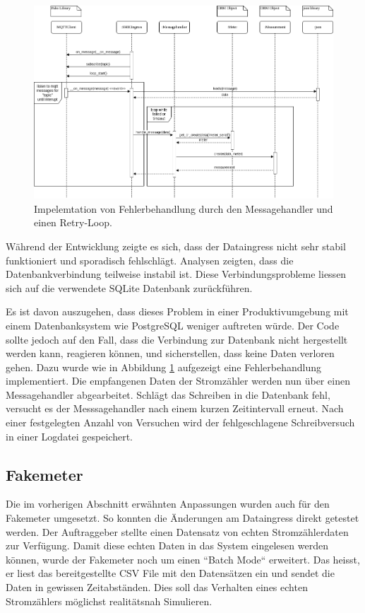 \begin{figure}[H]
    \centering
    \includegraphics[width=1.0\textwidth]{gfx/dataingress-sequence}
    \caption{
        Impelemtation von Fehlerbehandlung durch den Messagehandler und einen
        Retry-Loop.
    }
    \label{fig:dataingress-sequence}
\end{figure}

Während der Entwicklung zeigte es sich, dass der Dataingress nicht sehr stabil
funktioniert und sporadisch fehlschlägt. Analysen zeigten, dass
die Datenbankverbindung teilweise instabil ist.
Diese Verbindungsprobleme liessen sich auf die verwendete SQLite Datenbank zurückführen.

Es ist davon auszugehen, dass dieses Problem in einer Produktivumgebung mit einem Datenbanksystem wie PostgreSQL
weniger auftreten würde.
Der Code sollte jedoch auf den Fall, dass die Verbindung zur Datenbank nicht hergestellt werden kann, reagieren können,
und sicherstellen, dass keine Daten verloren gehen.
Dazu wurde wie in Abbildung \ref{fig:dataingress-sequence} aufgezeigt
eine Fehlerbehandlung implementiert.
Die empfangenen Daten der Stromzähler
werden nun über einen Messagehandler abgearbeitet.
Schlägt das Schreiben in die Datenbank fehl, versucht es der Messsagehandler nach einem kurzen Zeitintervall erneut.
Nach einer festgelegten Anzahl von Versuchen wird der fehlgeschlagene Schreibversuch in einer Logdatei gespeichert.

\subsection{Fakemeter}
Die im vorherigen Abschnitt erwähnten Anpassungen wurden auch für den Fakemeter umgesetzt.
So konnten die Änderungen am Dataingress direkt getestet werden. 
Der Auftraggeber stellte einen Datensatz von echten Stromzählerdaten
zur Verfügung. Damit diese echten Daten in das System eingelesen werden können,
wurde der Fakemeter noch um einen ``Batch Mode`` erweitert. Das heisst,
er liest das bereitgestellte CSV File mit den Datensätzen ein und sendet die Daten in
gewissen Zeitabständen. Dies soll das Verhalten eines echten Stromzählers
möglichst realitätsnah Simulieren. 

